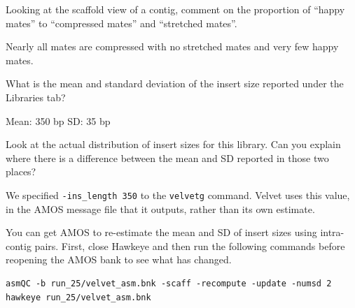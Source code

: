 \begin{questions}
Looking at the scaffold view of a contig, comment on the proportion of ``happy
mates'' to ``compressed mates'' and ``stretched mates''.
\begin{answer}
Nearly all mates are compressed with no stretched mates and very few happy
mates.
\end{answer}

What is the mean and standard deviation of the insert size reported under the
Libraries tab?
\begin{answer}
Mean: 350 bp
SD: 35 bp
\end{answer}

Look at the actual distribution of insert sizes for this library. Can you
explain where there is a difference between the mean and SD reported in those
two places?
\begin{answer}
We specified \texttt{-ins\_length 350} to the \texttt{velvetg} command. Velvet
uses this value, in the AMOS message file that it outputs, rather than its own
estimate.
\end{answer}
\end{questions}

\begin{steps}
You can get AMOS to re-estimate the mean and SD of insert sizes using
intra-contig pairs. First, close Hawkeye and then run the following commands
before reopening the AMOS bank to see what has changed.
\begin{lstlisting}
asmQC -b run_25/velvet_asm.bnk -scaff -recompute -update -numsd 2
hawkeye run_25/velvet_asm.bnk
\end{lstlisting}
\end{steps}

